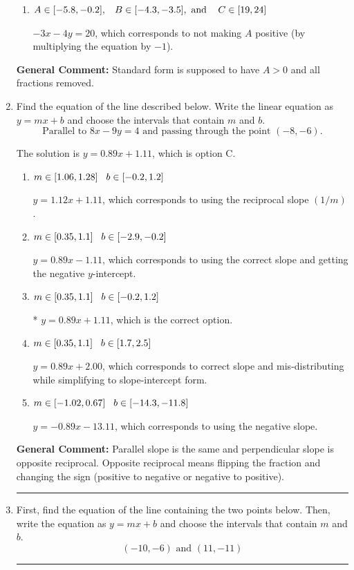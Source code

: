 \documentclass{extbook}[14pt]
\newcommand{\litem}[1]{\item #1

\rule{\textwidth}{0.4pt}}
\begin{document}
\begin{enumerate}
{\begin{enumerate}[label=\Alph*.]
 $3x - 4y = 20$, which corresponds to using the opposite (negative) slope of the graph, but did everything else correctly.
\item \( A \in [-5.8, -0.2], \hspace{3mm} B \in [-4.3, -3.5], \text{ and } \hspace{3mm} C \in [19, 24] \)

 $-3x - 4y = 20$, which corresponds to not making $A$ positive (by multiplying the equation by $-1$).
\end{enumerate}

\textbf{General Comment:} Standard form is supposed to have $A > 0$ and all fractions removed.
}
\litem{
Find the equation of the line described below. Write the linear equation as $ y=mx+b $ and choose the intervals that contain $m$ and $b$.
\[ \text{Parallel to } 8 x - 9 y = 4 \text{ and passing through the point } (-8, -6). \]

The solution is \( y = 0.89x + 1.11 \), which is option C.\begin{enumerate}[label=\Alph*.]
\item \( m \in [1.06, 1.28] \hspace*{3mm} b \in [-0.2, 1.2] \)

 $y = 1.12x + 1.11$, which corresponds to using the reciprocal slope $(1/m)$.
\item \( m \in [0.35, 1.1] \hspace*{3mm} b \in [-2.9, -0.2] \)

 $y = 0.89x - 1.11$, which corresponds to using the correct slope and getting the negative $y$-intercept.
\item \( m \in [0.35, 1.1] \hspace*{3mm} b \in [-0.2, 1.2] \)

* $y = 0.89x + 1.11$, which is the correct option.
\item \( m \in [0.35, 1.1] \hspace*{3mm} b \in [1.7, 2.5] \)

 $y = 0.89x + 2.00$, which corresponds to correct slope and mis-distributing while simplifying to slope-intercept form.
\item \( m \in [-1.02, 0.67] \hspace*{3mm} b \in [-14.3, -11.8] \)

 $y = -0.89x - 13.11$, which corresponds to using the negative slope.
\end{enumerate}

\textbf{General Comment:} Parallel slope is the same and perpendicular slope is opposite reciprocal. Opposite reciprocal means flipping the fraction and changing the sign (positive to negative or negative to positive).
}
\litem{
First, find the equation of the line containing the two points below. Then, write the equation as $ y=mx+b $ and choose the intervals that contain $m$ and $b$.
\[ (-10, -6) \text{ and } (11, -11) \]

}
\end{enumerate}
\end{document}
